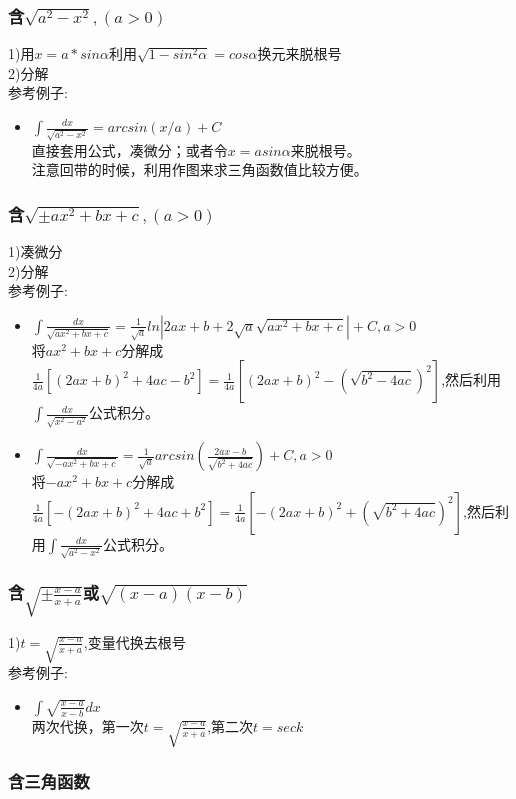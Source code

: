 \documentclass[fleqn]{article}
\begin{document}
\begin{flushleft}
		\subsubsection{含$\sqrt{a^2-x^2},(a>0)$}
		1)用$x=a*sin\alpha$利用$\sqrt{1-sin^2\alpha}=cos\alpha$换元来脱根号\\
		2)分解\\
		参考例子:\\
		\begin{itemize}
			\item $\int \frac{dx}{\sqrt{a^2-x^2}}=arcsin(x/a)+C$\\
			直接套用公式，凑微分；或者令$x=asin\alpha$来脱根号。\\
			注意回带的时候，利用作图来求三角函数值比较方便。\\
		\end{itemize}
	\subsubsection{含$\sqrt{\pm ax^2+bx+c},(a>0)$}
		1)凑微分\\
		2)分解\\
		参考例子:\\
		\begin{itemize}
			\item $\int \frac{dx}{\sqrt{ax^2+bx+c}}=\frac{1}{\sqrt{a}}ln|2ax+b+2\sqrt{a}\sqrt{ax^2+bx+c}|+C,a>0$ \\
				将$ax^2+bx+c$分解成$\frac{1}{4a}[(2ax+b)^2+4ac-b^2]=\frac{1}{4a}[(2ax+b)^2-(\sqrt{b^2-4ac})^2]$,然后利用$\int \frac{dx}{\sqrt{x^2-a^2}}$公式积分。

			\item $\int \frac{dx}{\sqrt{-ax^2+bx+c}}=\frac{1}{\sqrt{a}}arcsin(\frac{2ax-b}{\sqrt{b^2+4ac}})+C,a>0$ \\
				将$-ax^2+bx+c$分解成$\frac{1}{4a}[-(2ax+b)^2+4ac+b^2]=\frac{1}{4a}[-(2ax+b)^2+(\sqrt{b^2+4ac})^2]$,然后利用$\int \frac{dx}{\sqrt{a^2-x^2}}$公式积分。
		\end{itemize}
		\subsubsection{含$\sqrt{\pm \frac{x-a}{x+a}}$或$\sqrt{(x-a)(x-b)}$}
		1)$t=\sqrt{\frac{x-a}{x+a}}$,变量代换去根号\\
		参考例子:\\
		\begin{itemize}
			\item $\int \sqrt{\frac{x-a}{x-b}}dx$\\
				两次代换，第一次$t=\sqrt{\frac{x-a}{x+a}}$,第二次$t=seck$


		\end{itemize}
		\subsubsection{含三角函数}
\end{flushleft}
\end{document}
